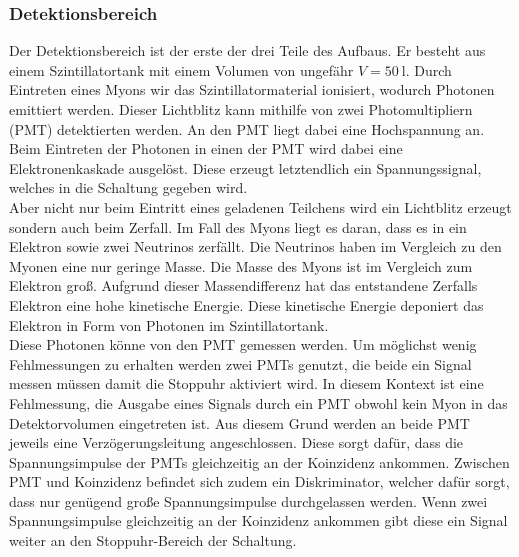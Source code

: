\subsubsection{Detektionsbereich}
Der Detektionsbereich ist der erste der drei Teile des Aufbaus.
Er besteht aus einem Szintillatortank mit einem Volumen von ungefähr $V = \SI{50}{\litre}$.
Durch Eintreten eines Myons wir das Szintillatormaterial ionisiert, wodurch Photonen emittiert werden.
Dieser Lichtblitz kann mithilfe von zwei Photomultipliern (PMT) detektierten werden.
An den PMT liegt dabei eine Hochspannung an.
Beim Eintreten der Photonen in einen der PMT wird dabei eine Elektronenkaskade ausgelöst.
Diese erzeugt letztendlich ein Spannungssignal, welches in die Schaltung gegeben wird.\\
Aber nicht nur beim Eintritt eines geladenen Teilchens wird ein Lichtblitz erzeugt sondern auch beim Zerfall.
Im Fall des Myons liegt es daran, dass es in ein Elektron sowie zwei Neutrinos zerfällt.
Die Neutrinos haben im Vergleich zu den Myonen eine nur geringe Masse.
Die Masse des Myons ist im Vergleich zum Elektron groß.
Aufgrund dieser Massendifferenz hat das entstandene Zerfalls Elektron eine hohe kinetische Energie.
Diese kinetische Energie deponiert das Elektron in Form von Photonen im Szintillatortank.\\
Diese Photonen könne von den PMT gemessen werden.
Um möglichst wenig Fehlmessungen zu erhalten werden zwei PMTs genutzt, die beide ein Signal messen müssen damit die Stoppuhr aktiviert wird.
In diesem Kontext ist eine Fehlmessung, die Ausgabe eines Signals durch ein PMT obwohl kein Myon in das Detektorvolumen eingetreten ist.
Aus diesem Grund werden an beide PMT jeweils eine Verzögerungsleitung angeschlossen.
Diese sorgt dafür, dass die Spannungsimpulse der PMTs gleichzeitig an der Koinzidenz ankommen.
Zwischen PMT und Koinzidenz befindet sich zudem ein Diskriminator, welcher dafür sorgt, dass nur genügend große Spannungsimpulse durchgelassen werden.
Wenn zwei Spannungsimpulse gleichzeitig an der Koinzidenz ankommen gibt diese ein Signal weiter an den Stoppuhr-Bereich der Schaltung.
